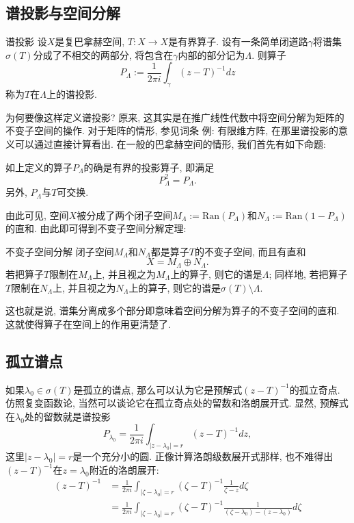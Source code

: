 

\subsection{谱投影与空间分解}
\begin{definition}{谱投影}
设$X$是复巴拿赫空间, $T:X\to X$是有界算子. 设有一条简单闭道路$\gamma$将谱集$\sigma(T)$分成了不相交的两部分, 将包含在$\gamma$内部的部分记为$\Lambda$. 则算子
$$
P_\Lambda:=\frac{1}{2\pi i}\int_\gamma(z-T)^{-1}dz
$$
称为$T$在$\Lambda$上的谱投影.
\end{definition}

为何要像这样定义谱投影? 原来, 这其实是在推广线性代数中将空间分解为矩阵的不变子空间的操作. 对于矩阵的情形, 参见词条 例: 有限维方阵, 在那里谱投影的意义可以通过直接计算看出. 在一般的巴拿赫空间的情形, 我们首先有如下命题:

\begin{lemma}{}
如上定义的算子$P_\Lambda$的确是有界的投影算子, 即满足
$$
P_\Lambda^2=P_\Lambda.
$$
另外, $P_\Lambda$与$T$可交换.
\end{lemma}

由此可见, 空间$X$被分成了两个闭子空间$M_\Lambda:=\text{Ran}(P_\Lambda)$和$N_\Lambda:=\text{Ran}(1-P_\Lambda)$的直和. 由此即可得到不变子空间分解定理:

\begin{theorem}{不变子空间分解}
闭子空间$M_\Lambda$和$N_\Lambda$都是算子$T$的不变子空间, 而且有直和
$$
X=M_\Lambda\oplus N_\Lambda.
$$
若把算子$T$限制在$M_\Lambda$上, 并且视之为$M_\Lambda$上的算子, 则它的谱是$\Lambda$; 同样地, 若把算子$T$限制在$N_\Lambda$上, 并且视之为$N_\Lambda$上的算子, 则它的谱是$\sigma(T)\setminus\Lambda$.
\end{theorem}

这也就是说, 谱集分离成多个部分即意味着空间分解为算子的不变子空间的直和. 这就使得算子在空间上的作用更清楚了.

\subsection{孤立谱点}
如果$\lambda_0\in\sigma(T)$是孤立的谱点, 那么可以认为它是预解式$(z-T)^{-1}$的孤立奇点. 仿照复变函数论, 当然可以谈论它在孤立奇点处的留数和洛朗展开式. 显然, 预解式在$\lambda_0$处的留数就是谱投影
$$
P_{\lambda_0}=\frac{1}{2\pi i}\int_{|z-\lambda_0|=r}(z-T)^{-1}dz,
$$
这里$|z-\lambda_0|=r$是一个充分小的圆. 正像计算洛朗级数展开式那样, 也不难得出$(z-T)^{-1}$在$z=\lambda_0$附近的洛朗展开:
$$
\begin{aligned}
(z-T)^{-1}
&=\frac{1}{2\pi i}\int_{|\zeta-\lambda_0|=r}(\zeta-T)^{-1}\frac{1}{\zeta-z}d\zeta\\
&=\frac{1}{2\pi i}\int_{|\zeta-\lambda_0|=r}(\zeta-T)^{-1}\frac{1}{(\zeta-\lambda_0)-(z-\lambda_0)}d\zeta\\
\end{aligned}
$$